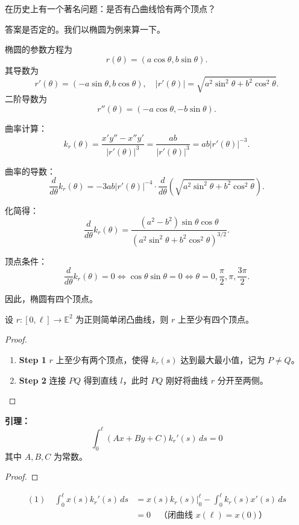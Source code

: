 \documentclass[lang=cn,10pt,thmcnt=section]{elegantbook}
\begin{document}
在历史上有一个著名问题：是否有凸曲线恰有两个顶点？

答案是否定的。我们以椭圆为例来算一下。

\begin{example}[椭圆的顶点]
    椭圆的参数方程为
    $$
    r(\theta) = (a \cos \theta, b \sin \theta).
    $$
    其导数为
    $$
    r'(\theta) = (-a \sin \theta, b \cos \theta), \quad |r'(\theta)| = \sqrt{a^2 \sin^2 \theta + b^2 \cos^2 \theta}.
    $$
    二阶导数为
    $$
    r''(\theta) = (-a \cos \theta, -b \sin \theta).
    $$
    
    曲率计算：
    $$
    k_r(\theta) = \frac{x' y'' - x'' y'}{|r'(\theta)|^3} = \frac{ab}{|r'(\theta)|^3} = ab |r'(\theta)|^{-3}.
    $$
    
    曲率的导数：
    $$
    \frac{d}{d\theta} k_r(\theta) = -3ab |r'(\theta)|^{-4} \cdot \frac{d}{d\theta} \left( \sqrt{a^2 \sin^2 \theta + b^2 \cos^2 \theta} \right).
    $$
    
    化简得：
    $$
    \frac{d}{d\theta} k_r(\theta) = \frac{(a^2 - b^2) \sin \theta \cos \theta}{\left( a^2 \sin^2 \theta + b^2 \cos^2 \theta \right)^{3/2}}.
    $$
    
    顶点条件：
    $$
    \frac{d}{d\theta} k_r(\theta) = 0 \Leftrightarrow \cos \theta \sin \theta = 0 \Leftrightarrow \theta = 0, \frac{\pi}{2}, \pi, \frac{3\pi}{2}.
    $$
    
    因此，椭圆有四个顶点。
 \end{example}
 \begin{theorem}[四顶点定理]
    设 $r: [0, \ell] \rightarrow \mathbb{E}^2$ 为正则简单闭凸曲线，则 $r$ 上至少有四个顶点。
    \end{theorem}
    
    \begin{proof}
        \begin{enumerate}
            \item \textbf{Step 1} $r$ 上至少有两个顶点，使得 $k_r(s)$ 达到最大最小值，记为 $P \neq Q$。
            \item \textbf{Step 2} 连接 $PQ$ 得到直线 $l$，此时 $PQ$ 刚好将曲线 $r$ 分开至两侧。

        \end{enumerate}
    \end{proof}
    
    
    \textbf{引理：}
    $$
    \int_0^{\ell} (Ax + By + C) k_r'(s) \, ds = 0
    $$
    其中 $A, B, C$ 为常数。
    
    \begin{proof}
        
    \end{proof}
    \begin{align*}
    (1) \quad \int_0^{\ell} x(s) k_r'(s) \, ds &= \left. x(s) k_r(s) \right|_0^{\ell} - \int_0^{\ell} k_r(s) x'(s) \, ds \\
    &= 0 \quad \text{（闭曲线 $x(\ell) = x(0)$）}
    \end{align*}
    
\end{document}
